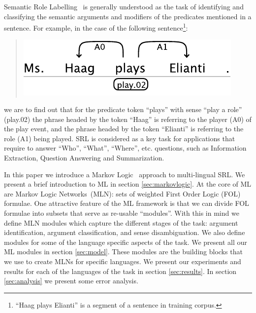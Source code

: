 
Semantic Role Labelling~\citep[SRL, ][]{marquez08srl} is generally understood as 
the task of identifying and classifying the semantic arguments and modifiers of 
the predicates mentioned in a sentence. For example, in the case of the 
following sentence\footnote{``Haag plays Elianti'' is a segment of a sentence in 
training corpus.}:
\begin{quote}
\begin{center}
    \includegraphics[scale=.63]{haag-example}
\end{center}
\end{quote}
we are to find out that for the predicate token {}``plays'' with sense ``play a 
role'' (play.02) the phrase headed by the token {}``Haag'' is referring to the 
player (A0) of the play event, and the phrase headed by the token {}``Elianti''  
is referring to the role (A1) being played. SRL is considered as a key task for 
applications that require to answer {}``Who'', {}``What'', {}``Where'', etc.  
questions, such as Information Extraction, Question Answering and Summarization.  

In this paper we introduce a Markov Logic~\citep[ML,][]{richardson06mln} approach to multi-lingual
SRL. We present a brief introduction to ML in 
section \ref{sec:markovlogic}.  At the core of ML are Markov Logic Networks~(MLN): sets of weighted First Order 
Logic (FOL) formulae. One attractive feature of the ML 
framework is that we can divide FOL formulae into subsets that serve as re-usable ``modules''. 
With this in mind we define MLN modules which capture the different stages of 
the task: argument identification, argument classification, and sense 
disambiguation. We also define modules for some of the language specific aspects of 
the task. We present all our ML modules in section 
\ref{sec:model}. These modules are the building blocks that we use to create 
MLNs for specific languages. We present our experiments and results for each of 
the languages of the task in section \ref{sec:results}. In section 
\ref{sec:analysis} we present some error analysis.


